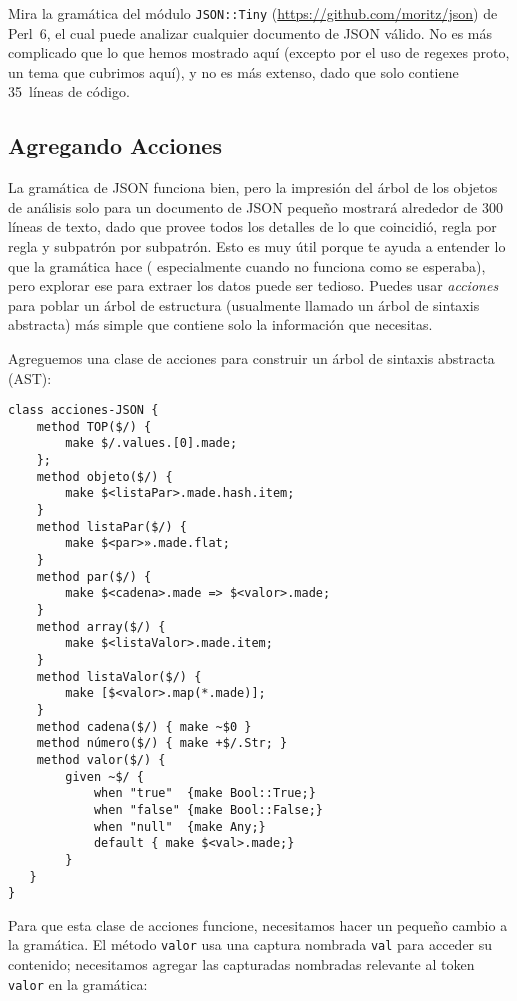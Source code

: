 Mira la gramática del módulo {\tt JSON::Tiny} 
(\url{https://github.com/moritz/json}) de Perl~6,
el cual puede analizar cualquier documento de JSON válido.
No es más complicado que lo que hemos mostrado aquí (excepto
por el uso de regexes proto, un tema que cubrimos aquí),
y no es más extenso, dado que solo contiene 35~líneas de
código.

\subsection{Agregando Acciones}

La gramática de JSON funciona bien, pero la impresión
del árbol de los objetos de análisis solo para un documento
de JSON pequeño mostrará alrededor de 300 líneas de texto,
dado que provee todos los detalles de lo que coincidió, 
regla por regla y subpatrón por subpatrón. Esto es muy útil
porque te ayuda a entender lo que la gramática hace (
especialmente cuando no funciona como se esperaba), 
pero explorar ese para extraer los datos puede ser tedioso.
Puedes usar \emph{acciones} para poblar un árbol de estructura
(usualmente llamado un árbol de sintaxis abstracta) más 
simple que contiene solo la información que necesitas.

Agreguemos una clase de acciones para construir un árbol
de sintaxis abstracta (AST):

\begin{verbatim}
class acciones-JSON {
    method TOP($/) {
        make $/.values.[0].made;
    };
    method objeto($/) {
        make $<listaPar>.made.hash.item;
    }
    method listaPar($/) {
        make $<par>».made.flat;
    }
    method par($/) {
        make $<cadena>.made => $<valor>.made;
    }
    method array($/) {
        make $<listaValor>.made.item;
    }
    method listaValor($/) {
        make [$<valor>.map(*.made)];
    }
    method cadena($/) { make ~$0 }
    method número($/) { make +$/.Str; }
    method valor($/) { 
        given ~$/ {
            when "true"  {make Bool::True;}
            when "false" {make Bool::False;}
            when "null"  {make Any;}
            default { make $<val>.made;}
        }  
   }
}
\end{verbatim}

Para que esta clase de acciones funcione, necesitamos hacer un
pequeño cambio a la gramática. El método {\tt valor} usa una
captura nombrada {\tt val} para acceder su contenido; necesitamos
agregar las capturadas nombradas relevante al token {\tt valor}
en la gramática:

